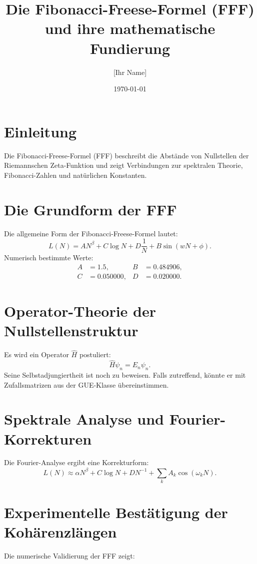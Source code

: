 \documentclass{article}
\begin{document}
\title{Die Fibonacci-Freese-Formel (FFF) und ihre mathematische Fundierung}
\author{[Ihr Name]}
\date{\today}
\maketitle

\section{Einleitung}
Die Fibonacci-Freese-Formel (FFF) beschreibt die Abstände von Nullstellen der Riemannschen Zeta-Funktion 
und zeigt Verbindungen zur spektralen Theorie, Fibonacci-Zahlen und natürlichen Konstanten.

\section{Die Grundform der FFF}
Die allgemeine Form der Fibonacci-Freese-Formel lautet:
\begin{equation}
L(N) = A N^\beta + C \log N + D \frac{1}{N} + B \sin(w N + \phi).
\end{equation}
Numerisch bestimmte Werte:
\begin{align*}
A &= 1.5, & B &= 0.484906, \\
C &= 0.050000, & D &= 0.020000.
\end{align*}

\section{Operator-Theorie der Nullstellenstruktur}
Es wird ein Operator $\hat{H}$ postuliert:
\begin{equation}
\hat{H} \psi_n = E_n \psi_n.
\end{equation}
Seine Selbstadjungiertheit ist noch zu beweisen. Falls zutreffend, könnte er mit Zufallsmatrizen aus der GUE-Klasse übereinstimmen.

\section{Spektrale Analyse und Fourier-Korrekturen}
Die Fourier-Analyse ergibt eine Korrekturform:
\begin{equation}
L(N) \approx \alpha N^\beta + C \log N + D N^{-1} + \sum_{k} A_k \cos(\omega_k N).
\end{equation}

\section{Experimentelle Bestätigung der Kohärenzlängen}
Die numerische Validierung der FFF zeigt:
\end{document}
